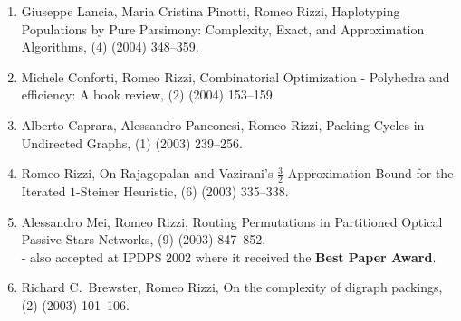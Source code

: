 \documentclass[11pt]{article}
\begin{document}
\begin{enumerate}
  \item {\sc Giuseppe Lancia, Maria Cristina Pinotti, Romeo Rizzi},
   \newblock  Haplotyping Populations by Pure Parsimony: Complexity, 
              Exact, and Approximation Algorithms,
   (4) (2004) 348--359.

  \item {\sc Michele Conforti, Romeo Rizzi},  
   \newblock  Combinatorial Optimization
              - Polyhedra and efficiency: A book review,
   (2) (2004) 153--159.

  \item {\sc Alberto Caprara, Alessandro Panconesi, Romeo Rizzi},
   \newblock  Packing Cycles in Undirected Graphs,
   (1) (2003) 239--256.

  \item {\sc Romeo Rizzi},
   \newblock  On Rajagopalan and Vazirani's $\frac{3}{2}$-Approximation
              Bound for the Iterated $1$-Steiner Heuristic,
   (6) (2003) 335--338.

  \item {\sc Alessandro Mei, Romeo Rizzi},
   \newblock  Routing Permutations in Partitioned Optical Passive Stars Networks,
   (9) (2003) 847--852.
   \newblock \\ - also accepted at IPDPS 2002 where it received the {\bf Best Paper Award}.

  \item {\sc Richard C.~Brewster, Romeo Rizzi},
   \newblock  On the complexity of digraph packings,
   (2) (2003) 101--106.


\end{enumerate}
\end{document}
